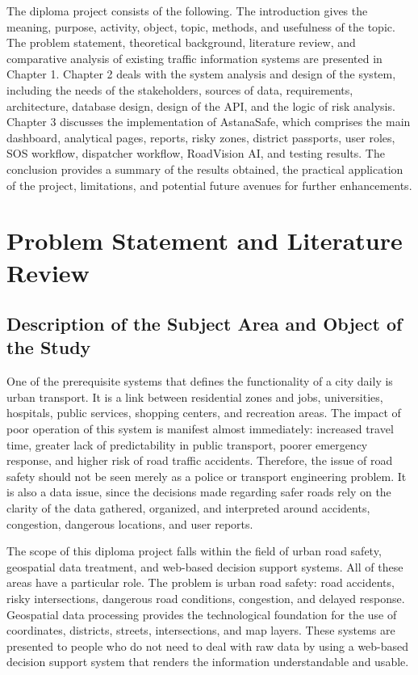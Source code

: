 ﻿\documentclass[12pt,a4paper]{report}
\begin{document}
The diploma project consists of the following. The introduction gives the meaning, purpose, activity, object, topic, methods, and usefulness of the topic. The problem statement, theoretical background, literature review, and comparative analysis of existing traffic information systems are presented in Chapter 1. Chapter 2 deals with the system analysis and design of the system, including the needs of the stakeholders, sources of data, requirements, architecture, database design, design of the API, and the logic of risk analysis. Chapter 3 discusses the implementation of AstanaSafe, which comprises the main dashboard, analytical pages, reports, risky zones, district passports, user roles, SOS workflow, dispatcher workflow, RoadVision AI, and testing results. The conclusion provides a summary of the results obtained, the practical application of the project, limitations, and potential future avenues for further enhancements.

\clearpage

\chapter{Problem Statement and Literature Review}

\section{Description of the Subject Area and Object of the Study}

One of the prerequisite systems that defines the functionality of a city daily is urban transport. It is a link between residential zones and jobs, universities, hospitals, public services, shopping centers, and recreation areas. The impact of poor operation of this system is manifest almost immediately: increased travel time, greater lack of predictability in public transport, poorer emergency response, and higher risk of road traffic accidents. Therefore, the issue of road safety should not be seen merely as a police or transport engineering problem. It is also a data issue, since the decisions made regarding safer roads rely on the clarity of the data gathered, organized, and interpreted around accidents, congestion, dangerous locations, and user reports.

The scope of this diploma project falls within the field of urban road safety, geospatial data treatment, and web-based decision support systems. All of these areas have a particular role. The problem is urban road safety: road accidents, risky intersections, dangerous road conditions, congestion, and delayed response. Geospatial data processing provides the technological foundation for the use of coordinates, districts, streets, intersections, and map layers. These systems are presented to people who do not need to deal with raw data by using a web-based decision support system that renders the information understandable and usable.
\end{document}
